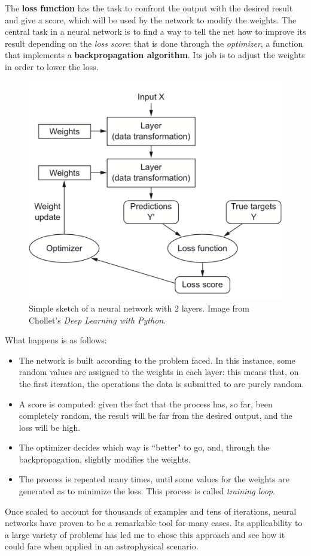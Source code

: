 \documentclass[12pt,a4paper,final]{book}			%
\begin{document}
			The \textbf{loss function} has the task to confront the output with the desired result and give a score, which will be used by the network to modify the weights. 
						The central task in a neural network is to find a way to tell the net how to improve its result depending on the \textit{loss score}: that is done through the \textit{optimizer}, a function that implements a \textbf{backpropagation algorithm}. Its job is to adjust the weights in order to lower the loss. 
			\begin{figure}[h!]
			\centering
				\includegraphics[scale=0.5]{figures/plagio_neural_network.png}
				\caption{Simple sketch of a neural network with 2 layers. Image from Chollet's \textit{Deep Learning with Python}.}
				\label{sketch_plagio}
			\end{figure}						
									
			What happens is as follows:
			\begin{itemize}
				\item The network is built according to the problem faced. In this instance, some random values are assigned to the weights in each layer: this means that, on the first iteration, the operations the data is submitted to are purely random.
				\item A score is computed: given the fact that the process has, so far, been completely random, the result will be far from the desired output, and the loss will be high.
				\item The optimizer decides which way is ``better" to go, and, through the backpropagation, slightly modifies the weights.
				\item The process is repeated many times, until some values for the weights are generated as to minimize the loss. This process is called \textit{training loop}.
			\end{itemize}
			Once scaled to account for thousands of examples and tens of iterations, neural networks have proven to be a remarkable tool for many cases. Its applicability to a large variety of problems has led me to chose this approach and see how it could fare when applied in an astrophysical scenario.\cite{chollet}			
\end{document}
